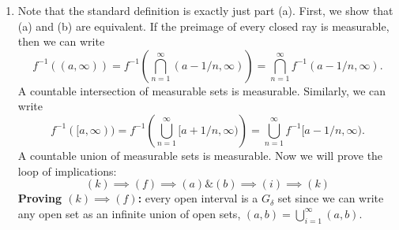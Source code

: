 \documentclass{article}
\begin{document}
\begin{enumerate}
\begin{enumerate}
\begin{lemma}
\begin{proof}
\begin{equation}
                    \int a + \int b = \int (a+b)
                \end{equation}
                where we are using the Lebesgue measure, which is defined as 
                \begin{equation}
                    \int a = m(\mathcal{U}(a)).
                \end{equation}
            \end{proof}
        \end{lemma}
        By the above lemma, $\log f+\log g$ is measurable, so $\log fg$ is measurable. Now it remains to show that if $h$ is measurable, then $e^h$ is measurable. To do so, consider the inverse map 
        \begin{equation}
            T^{-1}: (x,y) \mapsto (x,e^y)
        \end{equation}
        which is also a meseomorphism. Note that $e^x$ maps 
        \begin{equation}
            (0,a) \mapsto (1,e^a)
        \end{equation}
        so $T^{-1}$ maps 
        \begin{equation}
            T: \mathcal{U}(h) \mapsto \mathcal{U}(e^h) \cap (\mathbb{R} \times (0,1))^c
        \end{equation}
        The image is measurable and $(\mathbb{R} \times (0,1))$ is measurable, so $\mathcal{U}(e^h)$ is measurable, so $e^h$ is measurable. Therefore, let $h = \log(fg),$ which we've already shown is measurable. Then by the previous part, $e^h = fg$ is measurable, and we're done.
    \end{enumerate}

    \newpage
    \item Note that the standard definition is exactly just part (a). First, we show that (a) and (b) are equivalent. If the preimage of every closed ray is measurable, then we can write 
    \begin{equation}
        f^{-1}((a,\infty)) = f^{-1}\left(\bigcap_{n=1}^{\infty}(a-1/n,\infty)\right) = \bigcap_{n=1}^{\infty} f^{-1}(a-1/n,\infty).
    \end{equation}
    A countable intersection of measurable sets is measurable. Similarly, we can write 
    \begin{equation}
        f^{-1}([a,\infty)) = f^{-1}\left(\bigcup_{n=1}^{\infty}[a+1/n,\infty)\right) = \bigcup_{n=1}^{\infty} f^{-1}[a-1/n,\infty).
    \end{equation}
    A countable union of measurable sets is measurable. Now we will prove the loop of implications:
    \begin{equation}
        (k) \implies (f) \implies (a)\&(b) \implies (i) \implies (k)
    \end{equation}
    \textbf{Proving $(k)\implies (f)$:} every open interval is a $G_\delta$ set since we can write any open set as an infinite union of open sets, $(a,b) = \bigcup_{i=1}^{\infty}(a,b).$


\end{enumerate}
\end{document}
